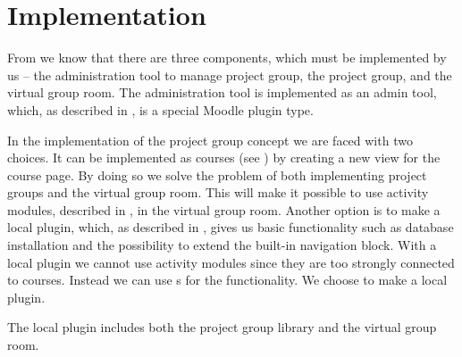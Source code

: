 \chapter{Implementation}
\label{chap:implementation}
%
From  we know that there are three components, which must be implemented by us -- the administration tool to manage project group, the project group, and the virtual group room. 
The administration tool is implemented as an admin tool, which, as described in , is a special Moodle plugin type. 

In the implementation of the project group concept we are faced with two choices. 
It can be implemented as courses (see ) by creating a new view for the course page. 
By doing so we solve the problem of both implementing project groups and the virtual group room.
This will make it possible to use activity modules, described in , in the virtual group room.
Another option is to make a local plugin, which, as described in , gives us basic functionality such as database installation and the possibility to extend the built-in navigation block. 
With a local plugin we cannot use activity modules since they are too strongly connected to courses. 
Instead we can use \block{}s for the functionality. 
We choose to make a local plugin.

The local plugin includes both the project group library and the virtual group room.


